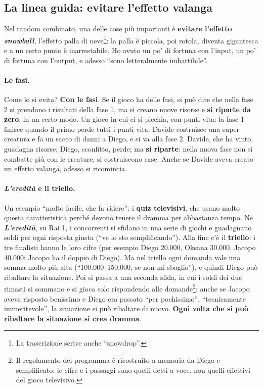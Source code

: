 \subsection{La linea guida: evitare l'effetto valanga}

Nel random combinato, una delle cose più importanti è \textbf{evitare l'effetto
\emph{snowball}}, l'effetto palla di neve\footnote{La trascrizione scrive anche
``snowdrop''.}: la palla è piccola, poi rotola, diventa gigantesca e a un certo punto è
inarrestabile. Ho avuto un po' di fortuna con l'input, un po' di fortuna con l'output, e
adesso ``sono letteralmente imbattibile''.

\paragraph{Le fasi.} Come lo si evita? \textbf{Con le fasi}. Se il gioco ha delle fasi, si
può dire che nella fase 2 si prendono i risultati della fase 1, ma si creano nuove risorse e
\textbf{si riparte da zero}, in un certo modo. Un gioco in cui ci si picchia, con punti vita:
la fase 1 finisce quando il primo perde tutti i punti vita. Davide costruisce una super
creatura e fa un sacco di danni a Diego, e si va alla fase 2. Davide, che ha vinto, guadagna
risorse; Diego, sconfitto, perde; ma \textbf{si riparte}: nella nuova fase non si combatte
più con le creature, si costruiscono case. Anche se Davide aveva creato un effetto valanga,
adesso si ricomincia.

\paragraph{\emph{L'eredità} e il triello.} Un esempio ``molto facile, che fa ridere'': i
\textbf{quiz televisivi}, che usano molto questa caratteristica perché devono tenere il dramma
per abbastanza tempo. Ne \textbf{\emph{L'eredità}}, su Rai 1, i concorrenti si sfidano in una
serie di giochi e guadagnano soldi per ogni risposta giusta (``ve lo sto semplificando''). Alla
fine c'è il \textbf{triello}: i tre finalisti hanno le loro cifre (per esempio Diego 20.000,
Oksana 30.000, Jacopo 40.000: Jacopo ha il doppio di Diego). Ma nel triello ogni domanda vale
una somma molto più alta (``100.000--150.000, se non mi sbaglio''), e quindi Diego può
ribaltare la situazione. Poi si passa a una seconda sfida, in cui i soldi dei due rimasti si
sommano e si gioca solo rispondendo alle domande\footnote{Il regolamento del programma è
ricostruito a memoria da Diego e semplificato: le cifre e i passaggi sono quelli detti a voce,
non quelli effettivi del gioco televisivo.}: anche se Jacopo aveva risposto benissimo e Diego
era passato ``per pochissimo'', ``tecnicamente immeritevole'', la situazione si può ribaltare
di nuovo. \textbf{Ogni volta che si può ribaltare la situazione si crea dramma}.

